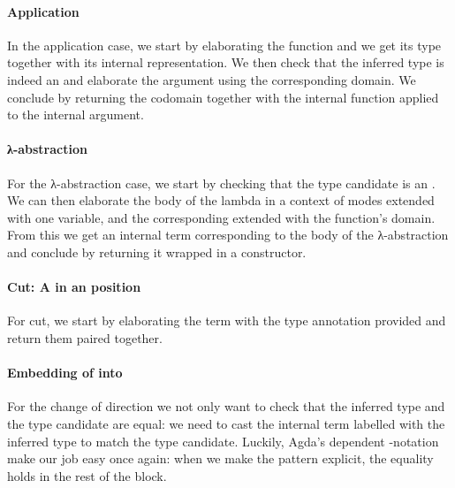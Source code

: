 \paragraph{Application} In the application case, we start by elaborating the
function and we get its type together with its internal representation. We then
check that the inferred type is indeed an  and elaborate the argument
using the corresponding domain. We conclude by returning the codomain together
with the internal function applied to the internal argument.
\begin{agdasnippet}
\end{agdasnippet}
\paragraph{λ-abstraction} For the λ-abstraction case, we start by
checking that the type candidate  is an . We can
then elaborate the body  of the lambda in a context of modes extended
with one  variable, and the corresponding  extended
with the function's domain. From this we get
an internal term  corresponding to the body of the λ-abstraction and
conclude by returning it wrapped in a  constructor.
\begin{agdasnippet}
\end{agdasnippet}
\paragraph{Cut: A  in an  position} For cut, we start by
elaborating the term with the type annotation provided and return them paired
together.
\begin{agdasnippet}
\end{agdasnippet}
\paragraph{Embedding of  into } For the change of direction
 we not only want to check that the inferred type and the type candidate
are equal: we need to cast the internal term labelled with the inferred type to
match the type candidate. Luckily, Agda's dependent -notation make our
job easy once again: when we make the pattern  explicit, the equality holds
in the rest of the block.
\begin{agdasnippet}
\end{agdasnippet}

